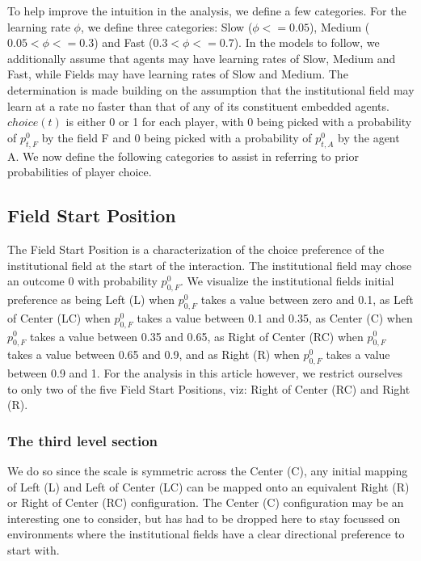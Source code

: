 \documentclass[12pt,letterpaper]{article}
\begin{document}
To help improve the intuition in the analysis, we define a few categories. For the learning rate $\phi$, we define three categories: Slow ($\phi <= 0.05$), Medium ($0.05 < \phi <= 0.3$) and Fast  ($0.3 < \phi <= 0.7$). In the models to follow, we additionally assume that agents may have learning rates of Slow, Medium and Fast, while Fields may have learning rates of Slow and Medium. The determination is made building on the assumption that the institutional field may learn at a rate no faster than that of any of its constituent embedded agents. $choice(t)$ is either 0 or 1 for each player, with 0 being picked with a probability of $p_{t,F}^0$ by the field F and 0 being picked with a probability of $p_{t,A}^0$ by the agent A. We now define the following categories to assist in referring to prior probabilities of player choice. 

\subsection{Field Start Position}
The Field Start Position is a characterization of the choice preference of the institutional field at the start of the interaction. The institutional field may chose an outcome 0 with probability  $p_{0,F}^0$. We visualize the institutional field\textquotesingle s initial preference as being Left (L) when $p_{0,F}^0$ takes a value between zero and 0.1, as Left of Center (LC) when $p_{0,F}^0$ takes a value between 0.1 and 0.35, as Center (C) when $p_{0,F}^0$ takes a value between 0.35 and 0.65,  as  Right of Center (RC) when $p_{0,F}^0$ takes a value between 0.65 and 0.9, and as Right (R) when $p_{0,F}^0$ takes a value between 0.9 and 1. For the analysis in this article however, we restrict ourselves to only two of the five Field Start Positions, viz: Right of Center (RC) and Right (R). 
\subsubsection{The third level section}
We do so since the scale is symmetric across the Center (C), any initial mapping of Left (L) and Left of Center (LC) can be mapped onto an equivalent Right (R) or Right of Center (RC) configuration. The Center (C) configuration may be an interesting one to consider, but has had to be dropped here to stay focussed on environments where the institutional fields have a clear directional preference to start with.
\end{document}
